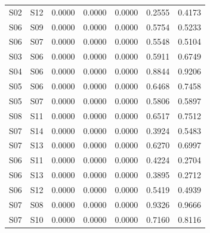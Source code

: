 \begin{table}
\begin{tabular}{llrrrrr}
S02 & S12 & 0.0000 & 0.0000 & 0.0000 & 0.2555 & 0.4173 \\
S06 & S09 & 0.0000 & 0.0000 & 0.0000 & 0.5754 & 0.5233 \\
S06 & S07 & 0.0000 & 0.0000 & 0.0000 & 0.5548 & 0.5104 \\
S03 & S06 & 0.0000 & 0.0000 & 0.0000 & 0.5911 & 0.6749 \\
S04 & S06 & 0.0000 & 0.0000 & 0.0000 & 0.8844 & 0.9206 \\
S05 & S06 & 0.0000 & 0.0000 & 0.0000 & 0.6468 & 0.7458 \\
S05 & S07 & 0.0000 & 0.0000 & 0.0000 & 0.5806 & 0.5897 \\
S08 & S11 & 0.0000 & 0.0000 & 0.0000 & 0.6517 & 0.7512 \\
S07 & S14 & 0.0000 & 0.0000 & 0.0000 & 0.3924 & 0.5483 \\
S07 & S13 & 0.0000 & 0.0000 & 0.0000 & 0.6270 & 0.6997 \\
S06 & S11 & 0.0000 & 0.0000 & 0.0000 & 0.4224 & 0.2704 \\
S06 & S13 & 0.0000 & 0.0000 & 0.0000 & 0.3895 & 0.2712 \\
S06 & S12 & 0.0000 & 0.0000 & 0.0000 & 0.5419 & 0.4939 \\
S07 & S08 & 0.0000 & 0.0000 & 0.0000 & 0.9326 & 0.9666 \\
S07 & S10 & 0.0000 & 0.0000 & 0.0000 & 0.7160 & 0.8116 \\
\bottomrule
\end{tabular}
\end{table}
